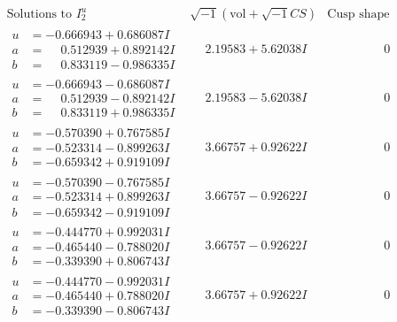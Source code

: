 \documentclass[1p]{elsarticle_modified}
\theoremstyle{definition}
\newcommand{\I}{\sqrt{-1}}
\begin{document}
$$\begin{array}{c|c|c}  
\text{Solutions to }I^u_{2}& \I (\text{vol} + \sqrt{-1}CS) & \text{Cusp shape}\\
 \hline 
\begin{aligned}
u &= -0.666943 + 0.686087 I \\
a &= \phantom{-}0.512939 + 0.892142 I \\
b &= \phantom{-}0.833119 - 0.986335 I\end{aligned}
 & \phantom{-}2.19583 + 5.62038 I & \phantom{-0.000000 } 0 \\ \hline\begin{aligned}
u &= -0.666943 - 0.686087 I \\
a &= \phantom{-}0.512939 - 0.892142 I \\
b &= \phantom{-}0.833119 + 0.986335 I\end{aligned}
 & \phantom{-}2.19583 - 5.62038 I & \phantom{-0.000000 } 0 \\ \hline\begin{aligned}
u &= -0.570390 + 0.767585 I \\
a &= -0.523314 - 0.899263 I \\
b &= -0.659342 + 0.919109 I\end{aligned}
 & \phantom{-}3.66757 + 0.92622 I & \phantom{-0.000000 } 0 \\ \hline\begin{aligned}
u &= -0.570390 - 0.767585 I \\
a &= -0.523314 + 0.899263 I \\
b &= -0.659342 - 0.919109 I\end{aligned}
 & \phantom{-}3.66757 - 0.92622 I & \phantom{-0.000000 } 0 \\ \hline\begin{aligned}
u &= -0.444770 + 0.992031 I \\
a &= -0.465440 - 0.788020 I \\
b &= -0.339390 + 0.806743 I\end{aligned}
 & \phantom{-}3.66757 - 0.92622 I & \phantom{-0.000000 } 0 \\ \hline\begin{aligned}
u &= -0.444770 - 0.992031 I \\
a &= -0.465440 + 0.788020 I \\
b &= -0.339390 - 0.806743 I\end{aligned}
 & \phantom{-}3.66757 + 0.92622 I & \phantom{-0.000000 } 0 \\ \hline\begin{aligned}

\end{aligned}
\end{array}$$
\end{document}
